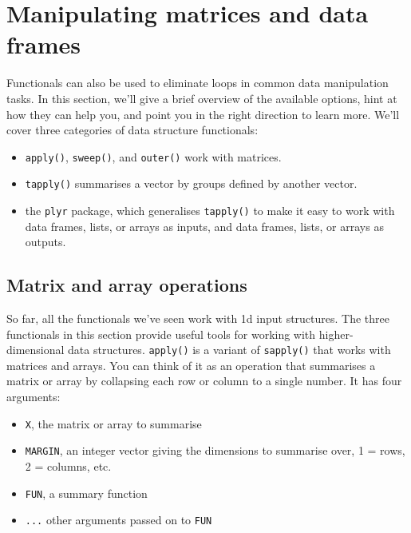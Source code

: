\hypertarget{functionals-ds}{%
\section{Manipulating matrices and data frames}\label{functionals-ds}}

Functionals can also be used to eliminate loops in common data
manipulation tasks. In this section, we'll give a brief overview of the
available options, hint at how they can help you, and point you in the
right direction to learn more. We'll cover three categories of data
structure functionals:

\begin{itemize}
\item
  \texttt{apply()}, \texttt{sweep()}, and \texttt{outer()} work with
  matrices.
\item
  \texttt{tapply()} summarises a vector by groups defined by another
  vector.
\item
  the \texttt{plyr} package, which generalises \texttt{tapply()} to make
  it easy to work with data frames, lists, or arrays as inputs, and data
  frames, lists, or arrays as outputs.
\end{itemize}

\hypertarget{matrix-and-array-operations}{%
\subsection{Matrix and array
operations}\label{matrix-and-array-operations}}

So far, all the functionals we've seen work with 1d input structures.
The three functionals in this section provide useful tools for working
with higher-dimensional data structures. \texttt{apply()} is a variant
of \texttt{sapply()} that works with matrices and arrays. You can think
of it as an operation that summarises a matrix or array by collapsing
each row or column to a single number. It has four arguments:

\begin{itemize}
\tightlist
\item
  \texttt{X}, the matrix or array to summarise
\item
  \texttt{MARGIN}, an integer vector giving the dimensions to summarise
  over, 1 = rows, 2 = columns, etc.
\item
  \texttt{FUN}, a summary function
\item
  \texttt{...} other arguments passed on to \texttt{FUN}
\end{itemize}

